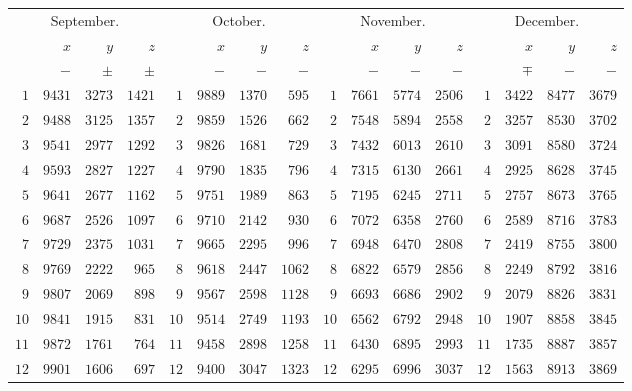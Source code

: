 \begin{GaussVISolarFrame}
\begingroup\fontsize{9}{10.2}\selectfont\setlength{\tabcolsep}{1.9pt}
\begin{tabular}{r|r|r|r||r|r|r|r||r|r|r|r||r|r|r|r}
\multicolumn{4}{c||}{September.} & \multicolumn{4}{c||}{October.} & \multicolumn{4}{c||}{November.} & \multicolumn{4}{c}{December.}\\[3pt]
 & $x$ & $y$ & $z$ &  & $x$ & $y$ & $z$ &  & $x$ & $y$ & $z$ &  & $x$ & $y$ & $z$\\
 & $-$ & $\pm$ & $\pm$ &  & $-$ & $-$ & $-$ &  & $-$ & $-$ & $-$ &  & $\mp$ & $-$ & $-$\\\hline
$1$ & $9431$ & $3273$ & $1421$ & $1$ & $9889$ & $1370$ & $595$ & $1$ & $7661$ & $5774$ & $2506$ & $1$ & $3422$ & $8477$ & $3679$\\
$2$ & $9488$ & $3125$ & $1357$ & $2$ & $9859$ & $1526$ & $662$ & $2$ & $7548$ & $5894$ & $2558$ & $2$ & $3257$ & $8530$ & $3702$\\
$3$ & $9541$ & $2977$ & $1292$ & $3$ & $9826$ & $1681$ & $729$ & $3$ & $7432$ & $6013$ & $2610$ & $3$ & $3091$ & $8580$ & $3724$\\
$4$ & $9593$ & $2827$ & $1227$ & $4$ & $9790$ & $1835$ & $796$ & $4$ & $7315$ & $6130$ & $2661$ & $4$ & $2925$ & $8628$ & $3745$\\
$5$ & $9641$ & $2677$ & $1162$ & $5$ & $9751$ & $1989$ & $863$ & $5$ & $7195$ & $6245$ & $2711$ & $5$ & $2757$ & $8673$ & $3765$\\[3pt]
$6$ & $9687$ & $2526$ & $1097$ & $6$ & $9710$ & $2142$ & $930$ & $6$ & $7072$ & $6358$ & $2760$ & $6$ & $2589$ & $8716$ & $3783$\\
$7$ & $9729$ & $2375$ & $1031$ & $7$ & $9665$ & $2295$ & $996$ & $7$ & $6948$ & $6470$ & $2808$ & $7$ & $2419$ & $8755$ & $3800$\\
$8$ & $9769$ & $2222$ & $965$ & $8$ & $9618$ & $2447$ & $1062$ & $8$ & $6822$ & $6579$ & $2856$ & $8$ & $2249$ & $8792$ & $3816$\\
$9$ & $9807$ & $2069$ & $898$ & $9$ & $9567$ & $2598$ & $1128$ & $9$ & $6693$ & $6686$ & $2902$ & $9$ & $2079$ & $8826$ & $3831$\\
$10$ & $9841$ & $1915$ & $831$ & $10$ & $9514$ & $2749$ & $1193$ & $10$ & $6562$ & $6792$ & $2948$ & $10$ & $1907$ & $8858$ & $3845$\\[3pt]
$11$ & $9872$ & $1761$ & $764$ & $11$ & $9458$ & $2898$ & $1258$ & $11$ & $6430$ & $6895$ & $2993$ & $11$ & $1735$ & $8887$ & $3857$\\
$12$ & $9901$ & $1606$ & $697$ & $12$ & $9400$ & $3047$ & $1323$ & $12$ & $6295$ & $6996$ & $3037$ & $12$ & $1563$ & $8913$ & $3869$\\

\end{tabular}
\end{GaussVISolarFrame}
